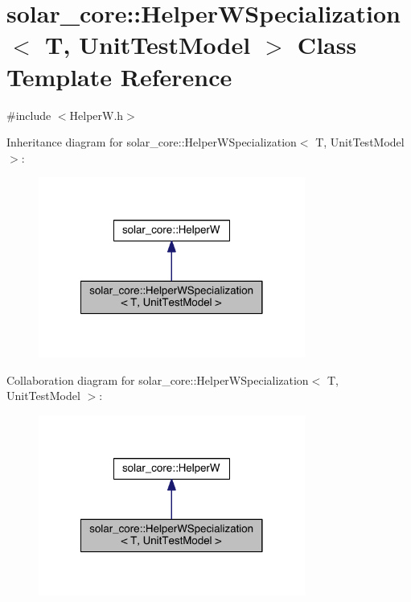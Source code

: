 \hypertarget{classsolar__core_1_1_helper_w_specialization_3_01_t_00_01_unit_test_model_01_4}{}\section{solar\+\_\+core\+:\+:Helper\+W\+Specialization$<$ T, Unit\+Test\+Model $>$ Class Template Reference}
\label{classsolar__core_1_1_helper_w_specialization_3_01_t_00_01_unit_test_model_01_4}


{\ttfamily \#include $<$Helper\+W.\+h$>$}



Inheritance diagram for solar\+\_\+core\+:\+:Helper\+W\+Specialization$<$ T, Unit\+Test\+Model $>$\+:
\nopagebreak
\begin{figure}[H]
\begin{center}
\leavevmode
\includegraphics[width=248pt]{classsolar__core_1_1_helper_w_specialization_3_01_t_00_01_unit_test_model_01_4__inherit__graph}
\end{center}
\end{figure}


Collaboration diagram for solar\+\_\+core\+:\+:Helper\+W\+Specialization$<$ T, Unit\+Test\+Model $>$\+:
\nopagebreak
\begin{figure}[H]
\begin{center}
\leavevmode
\includegraphics[width=248pt]{classsolar__core_1_1_helper_w_specialization_3_01_t_00_01_unit_test_model_01_4__coll__graph}
\end{center}
\end{figure}

